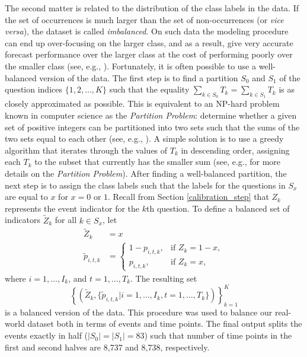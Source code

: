\documentclass[aoas, preprint]{imsart}
\numberwithin{equation}{section}
\theoremstyle{plain}
\begin{document}
The second matter is related to the distribution of the class labels in the data. If the set of occurrences is much larger than the set of non-occurrences (or \textit{vice versa}), the dataset is called \textit{imbalanced}. On such data the modeling procedure can end up over-focusing on the larger class, and as a result, give very accurate forecast performance over the larger class at the cost of performing poorly over the smaller class (see, e.g., \citet{chen2009learning, wallace2012class}). Fortunately, it is often possible to use a well-balanced version of the data. The first step is to find a partition $S_0$ and $S_1$ of the question indices $\{1, 2, \dots, K\}$ such that the equality $\sum_{k \in S_0} T_k  = \sum_{k \in S_1} T_k$ is as closely approximated as possible. This is equivalent to an NP-hard problem known in computer science as the \textit{Partition Problem}:  determine whether a given set of positive integers can be partitioned into two sets such that the sums of the two sets equal to each other (see, e.g., \citet{karmarkar1982differencing, hayes2002easiest}). A simple solution is to use a greedy algorithm that iterates through the values of $T_k$ in descending order, assigning each $T_k$ to the subset that currently has the smaller sum (see, e.g., \citet{kellerer2004knapsack, gent1996phase} for more details on the \textit{Partition Problem}). After finding a well-balanced partition, the next step is to assign the class labels such that the labels for the questions in $S_x$ are equal to $x$ for $x = 0$ or $1$. Recall from Section \ref{calibration_step} that $Z_k$ represents the event indicator for the $k$th question. To define a balanced set of indicators $ \tilde{Z}_k$ for all $k \in S_x$, let
\begin{align*}
 \tilde{Z}_k &= x\\
\tilde{p}_{i,t,k} &=  \begin{cases} 
1-p_{i,t,k}, & \text{if } Z_k = 1-x,\\
p_{i,t,k}, & \text{if } Z_k = x,
\end{cases}
\end{align*}
where $i = 1, \dots, I_k$, and $t = 1, \dots, T_k$. The resulting set $$\left\{\left(\tilde{Z}_k, \{\tilde{p}_{i,t,k} | i = 1, \dots, I_k, t = 1, \dots, T_k \}\right) \right\}_{k=1}^K$$ is a balanced version of the data. 
This procedure was used to balance our real-world dataset both in terms of events and time points. The final output splits the events exactly in half ($|S_0| = |S_1| = 83$) such that number of time points in the first and second halves are 8,737 and 8,738, respectively. 
\end{document}
